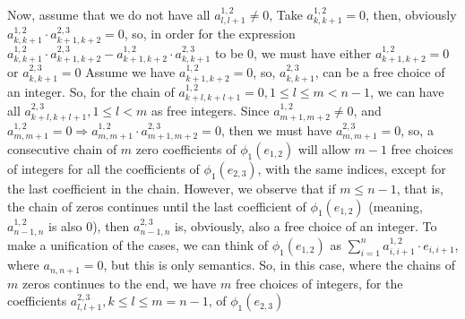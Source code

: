 \documentclass[12pt]{article}
\begin{document}
Now, assume that we do not have all $a_{l,l+1}^{1,2} \neq 0$, \newline
Take $a_{k,k+1}^{1,2}=0$, then, obviously $a_{k,k+1}^{1,2} \cdot a_{k+1,k+2}^{2,3}=0$, \newline
so, in order for the expression $a_{k,k+1}^{1,2} \cdot a_{k+1,k+2}^{2,3}-a_{k+1,k+2}^{1,2} \cdot a_{k,k+1}^{2,3}$ to be $0$, we must have either $a_{k+1,k+2}^{1,2}=0$ or $a_{k,k+1}^{2,3}=0$ \newline
Assume we have $a_{k+1,k+2}^{1,2}=0$, so, $a_{k,k+1}^{2,3}$, can be a free choice of an integer. \newline
So, for the chain of $a_{k+l,k+l+1}^{1,2}=0, 1 \leq l \leq m < n-1$, we can have all $a_{k+l,k+l+1}^{2,3}, 1 \leq l < m$ as free integers. Since $a_{m+1,m+2}^{1,2} \neq 0$, \newline
and $a_{m,m+1}^{1,2}=0 \Rightarrow a_{m,m+1}^{1,2} \cdot a_{m+1,m+2}^{2,3}=0$, then we must have $a_{m,m+1}^{2,3}=0$, so, a consecutive chain of $m$ zero coefficients of $\phi_1(e_{1,2})$ will allow $m-1$ free choices of integers for all the coefficients of $\phi_1(e_{2,3})$, with the same indices, except for the last coefficient in the chain. \newline
However, we observe that if $m \leq n-1$, that is, the chain of zeros continues until the last coefficient of $\phi_1(e_{1,2})$ (meaning, $a_{n-1,n}^{1,2}$ is also $0$), then $a_{n-1,n}^{2,3}$ is, obviously, also a free choice of an integer. To make a unification of the cases, we can think of $\phi_1(e_{1,2})$ as $\sum_{i=1}^n a_{i,i+1}^{1,2} \cdot e_{i,i+1}$, where $a_{n,n+1}=0$, but this is only semantics. \newline
So, in this case, where the chains of $m$ zeros continues to the end, we have $m$ free choices of integers, for the coefficients $a_{l,l+1}^{2,3}, k \leq l \leq m = n-1$, \newline
of $\phi_1(e_{2,3})$
\end{document}
